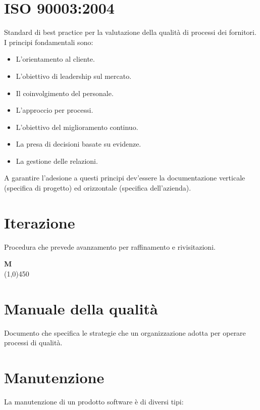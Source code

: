 \documentclass[11pt]{article}
\begin{document}
	\section{\LARGE ISO 90003:2004}
	\label{sec:iso90003}
	Standard di best practice per la valutazione della qualità di processi dei fornitori. I principi fondamentali sono:
	\begin{itemize}  
	\item L'orientamento al cliente.
	\item L'obiettivo di leadership sul mercato.
	\item Il coinvolgimento del personale.
	\item L'approccio per processi.
	\item L'obiettivo del miglioramento continuo.
	\item La presa di decisioni basate su evidenze.
	\item La gestione delle relazioni.
	\end{itemize}	
	A garantire l'adesione a questi principi dev'essere la documentazione verticale (specifica di progetto) ed orizzontale (specifica dell'azienda).	
	
	\section{\LARGE Iterazione}
	\label{sec:iterazione}
	Procedura che prevede avanzamento per raffinamento e rivisitazioni.\newpage

	{\Huge{\textbf{M}}} \\
	\line(1,0){450}
	
	\section{\LARGE Manuale della qualità}
	\label{sec:manualequalita}
	Documento che specifica le strategie che un organizzazione adotta per operare processi di qualità.
	
	
	\section{\LARGE Manutenzione}
	\label{sec:manutenzione}
	La manutenzione di un prodotto software è di diversi tipi:
		
\end{document}

